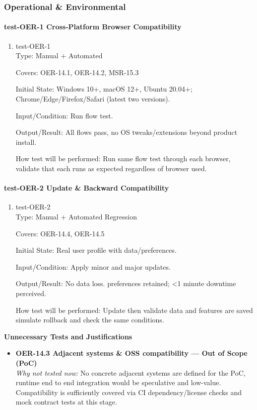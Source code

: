 \documentclass[12pt, titlepage]{article}
\begin{document}
\subsubsection{Operational \& Environmental}

\paragraph{test-OER-1 Cross-Platform Browser Compatibility}

\begin{enumerate}
\item{test-OER-1\\}
Type: Manual + Automated

Covers: OER-14.1, OER-14.2, MSR-15.3

Initial State: Windows 10+, macOS 12+, Ubuntu 20.04+; Chrome/Edge/Firefox/Safari (latest two versions).

Input/Condition: Run flow test.

Output/Result: All flows pass, no OS tweaks/extensions beyond product install.

How test will be performed: Run same flow test through each browser, validate that each runs as expected regardless of browser used.
\end{enumerate}

\paragraph{test-OER-2 Update \& Backward Compatibility}

\begin{enumerate}
\item{test-OER-2\\}
Type: Manual + Automated Regression

Covers: OER-14.4, OER-14.5

Initial State: Real user profile with data/preferences.

Input/Condition: Apply minor and major updates.

Output/Result: No data loss. preferences retained; <1 minute downtime perceived.

How test will be performed: Update then validate data and features are saved simulate rollback and check the same conditions.
\end{enumerate}

\noindent\textbf{Unnecessary Tests and Justifications}
\begin{itemize}
\item \textbf{OER-14.3 Adjacent systems \& OSS compatibility — Out of Scope (PoC)}\\
\emph{Why not tested now:} No concrete adjacent systems are defined for the PoC, runtime end to end integration would be speculative and low-value. Compatibility is sufficiently covered via CI dependency/license checks and mock contract tests at this stage.
\end{itemize}
\end{document}
